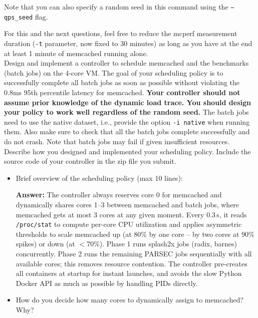 \begin{enumerate}
    Note that you can also specify a random seed in this command using the \texttt{--qps\_seed} flag. 

    For this and the next questions, feel free to reduce the mcperf measurement duration (\texttt{-t} parameter, now fixed to 30 minutes) as long as you have at the end at least 1 minute of memcached running alone.
    \\
    
    Design and implement a controller to schedule memcached and the benchmarks (batch jobs) on the 4-core VM. The goal of your scheduling policy is to successfully complete all batch jobs as soon as possible without violating the 0.8ms 95th percentile latency for memcached. \textbf{Your controller should not assume prior knowledge of the dynamic load trace. You should design your policy to work well regardless of the random seed.} The batch jobs need to use the native dataset, i.e., provide the option \texttt{-i native} when running them. Also make sure to check that all the batch jobs complete successfully and do not crash. Note that batch jobs may fail if given insufficient resources. \\
    
    Describe how you designed and implemented your scheduling policy. Include the source code of your controller in the zip file you submit. 

    \begin{itemize}
        \item Brief overview of the scheduling policy (max 10 lines):
        
    \textbf{Answer:} %
    The controller always reserves core 0 for memcached and dynamically shares cores 1--3 between memcached and batch jobs, where memcached gets at most 3 cores at any given moment. Every 0.3\,s, it reads \texttt{/proc/stat} to compute per-core CPU utilization and applies asymmetric thresholds to scale memcached up (at 80\% by one core – by two cores at 90\% spikes) or down (at $<$70\%). Phase 1 runs splash2x jobs (radix, barnes) concurrently. Phase 2 runs the remaining PARSEC jobs sequentially with all available cores; this removes resource contention. The controller pre-creates all containers at startup for instant launches, and avoids the slow Python Docker API as much as possible by handling PIDs directly.
    \\
     
    \item How do you decide how many cores to dynamically assign to memcached? Why?
    

\end{itemize}
\end{enumerate}
